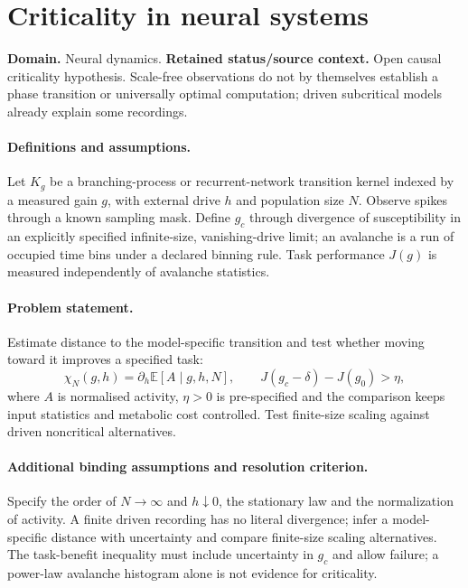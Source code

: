 \documentclass[11pt]{article}
\begin{document}
\section*{Criticality in neural systems}
\label{prob:108}
\label{rank:230}
\par\smallskip

\noindent\textbf{Domain.} Neural dynamics. \quad \textbf{Retained status/source context.} Open causal criticality hypothesis. Scale-free observations do not by themselves establish a phase transition or universally optimal computation; driven subcritical models already explain some recordings.
\paragraph{Definitions and assumptions.} Let $K_g$ be a branching-process or recurrent-network transition kernel indexed by a measured gain $g$, with external drive $h$ and population size $N$. Observe spikes through a known sampling mask. Define $g_c$ through divergence of susceptibility in an explicitly specified infinite-size, vanishing-drive limit; an avalanche is a run of occupied time bins under a declared binning rule. Task performance $J(g)$ is measured independently of avalanche statistics.
\paragraph{Problem statement.} Estimate distance to the model-specific transition and test whether moving toward it improves a specified task:
\[
\chi_N(g,h)=\partial_h\mathbb{E}[A\mid g,h,N],\qquad
J(g_c-\delta)-J(g_0)>\eta,
\]
where $A$ is normalised activity, $\eta>0$ is pre-specified and the comparison keeps input statistics and metabolic cost controlled. Test finite-size scaling against driven noncritical alternatives.
\paragraph{Additional binding assumptions and resolution criterion.} Specify the order of $N\to\infty$ and $h\downarrow0$, the stationary law and the normalization of activity. A finite driven recording has no literal divergence; infer a model-specific distance with uncertainty and compare finite-size scaling alternatives. The task-benefit inequality must include uncertainty in $g_c$ and allow failure; a power-law avalanche histogram alone is not evidence for criticality.
\end{document}
